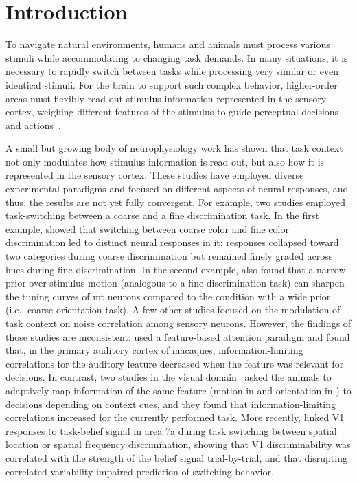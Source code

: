 \documentclass[lineno,pdflatex,sn-basic]{sn-jnl}%
\theoremstyle{thmstyleone}%
\theoremstyle{thmstyletwo}%
\theoremstyle{thmstylethree}%
\begin{document}
\section{Introduction}\label{introduction}

To navigate natural environments, humans and animals must process various stimuli while accommodating to changing task demands. In many situations, it is necessary to rapidly switch between tasks while processing very similar or even identical stimuli. For the brain to support such complex behavior, higher-order areas must flexibly read out stimulus information represented in the sensory cortex,  weighing different features of the stimulus to guide perceptual decisions and actions~\citep{okazawa2023neural}. 

A small but growing body of neurophysiology work has shown that task context not only modulates how stimulus information is read out, but also how it is represented in the sensory cortex. These studies have employed diverse experimental paradigms and focused on different aspects of neural responses, and thus, the results are not yet fully convergent. For example, two studies employed task-switching between a coarse and a fine discrimination task.
In the first example, \citet{tajima2017task} showed that switching between coarse color and fine color discrimination led to distinct neural responses in \gls{it}: responses collapsed toward two categories during coarse discrimination but remained finely graded across hues during fine discrimination. 
In the second example, \citet{park2023prior} also found that a narrow prior over stimulus motion (analogous to a fine discrimination task) can sharpen the tuning curves of \gls{mt} neurons compared to the condition with a wide prior (i.e., coarse orientation task). 
A few other studies focused on the modulation of task context on noise correlation among sensory neurons. However, the findings of those studies are inconsistent: \citet{downer2017feature} used a feature-based attention paradigm and found that, in the primary auditory cortex of macaques, information-limiting correlations for the auditory feature decreased when the feature was relevant for decisions. 
In contrast, two studies in the visual domain~\citep{cohen2008context, bondy2018feedback} asked the animals to adaptively map information of the same feature (motion in \citet{cohen2008context} and orientation in \citet{bondy2018feedback}) to decisions depending on context cues, and they found that information-limiting correlations increased for the currently performed task. More recently, \citet{xue2022dynamic} linked V1 responses to task-belief signal in area 7a during task switching between spatial location or spatial frequency discrimination, showing that V1 discriminability was correlated with the strength of the belief signal trial-by-trial, and that disrupting correlated variability impaired prediction of switching behavior.
\end{document}
